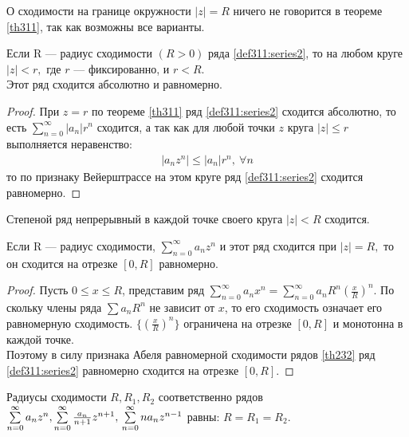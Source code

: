 \begin{remark}
  О сходимости на границе окружности $|z| = R$ ничего не говорится в теореме
  \eqref{th311}, так как возможны все варианты.
\end{remark}

\begin{theorem}
  \label{th312}
  Если R --- радиус сходимости $(R > 0)$ ряда \eqref{def311:series2}, то на любом
  круге $|z| < r, $ где $r$ --- фиксированно, и $r < R$. \\
  Этот ряд сходится абсолютно и равномерно.
\end{theorem}

\begin{proof}
  При $z = r$ по теореме \eqref{th311} ряд \eqref{def311:series2} сходится
  абсолютно, то есть $\sum\limits_{n = 0}^{\infty} |a_n| r^n$ сходится, а так
  как для любой точки $z$ круга $|z| \leq r$ выполняется неравенство:
  \begin{gather*}
    |a_n z^n| \leq |a_n| r^n, \ \forall n
  \end{gather*}
  то по признаку Вейерштрассе на этом круге ряд \eqref{def311:series2} сходится
  равномерно.
\end{proof}

\begin{consequence}
  Степеной ряд непрерывный в каждой точке своего круга $|z| < R$ сходится.
\end{consequence}

\begin{theorem}[2-ая т. Абеля]
  \label{th313}
  Если R --- радиус сходимости, $\sum\limits_{n = 0}^{\infty} a_n z^n$ и этот
  ряд сходится при $|z| = R,$ то он сходится на отрезке $[0, R]$ равномерно.
\end{theorem}

\begin{proof}
  Пусть $0 \leq x \leq R$, представим ряд $\sum\limits_{n = 0}^{\infty} a_n x^n
  = \sum\limits_{n = 0}^{\infty} a_n R^n\left(\frac{x}{R}\right)^n$. По скольку
  члены ряда $\sum a_n R^n$ не зависит от $x$, то его сходимость означает его
  равномерную сходимость. $\{(\frac{x}{R})^n\}$ ограничена на отрезке $[0, R]$
  и монотонна в каждой точке. \\
  Поэтому в силу признака Абеля равномерной сходимости рядов \eqref{th232} ряд
  \eqref{def311:series2} равномерно сходится на отрезке $[0, R]$.
\end{proof}

\begin{lemma}
  \label{ch3:lemma1}
  Радиусы сходимости $R, R_1, R_2$ соответственно рядов
  $\sum\limits_{n = 0}^{\infty} a_n z^n, \sum\limits_{n = 0}^{\infty}
  \frac{a_n}{n + 1} z^{n+1}, \\ \sum\limits_{n = 0}^{\infty} n a_n z^{n - 1}$
  равны: $R = R_1 = R_2$.
\end{lemma}

